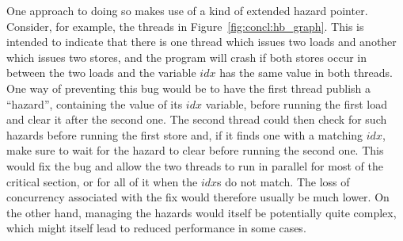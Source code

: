 One approach to doing so makes use of a kind of extended hazard
pointer\cite{Michael2004}.  Consider, for example, the threads in
Figure~\ref{fig:concl:hb_graph}.  This is intended to indicate that
there is one thread which issues two loads and another which issues
two stores, and the program will crash if both stores occur in between
the two loads and the variable $\mathit{idx}$ has the same value in
both threads.  One way of preventing this bug would be to have the
first thread publish a ``hazard'', containing the value of its
$\mathit{idx}$ variable, before running the first load and clear it
after the second one.  The second thread could then check for such
hazards before running the first store and, if it finds one with a
matching $\mathit{idx}$, make sure to wait for the hazard to clear
before running the second one.  This would fix the bug and allow the
two threads to run in parallel for most of the critical section, or
for all of it when the $\mathit{idx}$s do not match.  The loss of
concurrency associated with the fix would therefore usually be much
lower.  On the other hand, managing the hazards would itself be
potentially quite complex, which might itself lead to reduced
performance in some cases.
